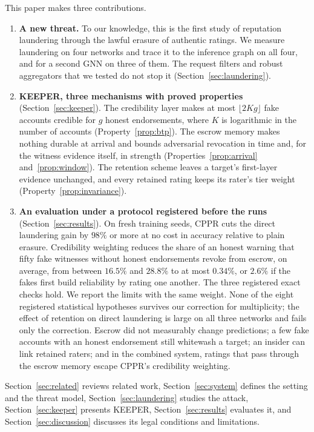 \documentclass[lettersize,journal]{IEEEtran}
\begin{document}
This paper makes three contributions.
\begin{enumerate}
  \item \textbf{A new threat.}
  To our knowledge, this is the first study of reputation laundering through the lawful erasure of authentic ratings.
  We measure laundering on four networks and trace it to the inference graph on all four, and for a second GNN on three of them. The request filters and robust aggregators that we tested do not stop it (Section~\ref{sec:laundering}).
  \item \textbf{KEEPER, three mechanisms with proved properties} (Section~\ref{sec:keeper}).
  The credibility layer makes at most $\lfloor 2Kg \rfloor$ fake accounts credible for $g$ honest endorsements, where $K$ is logarithmic in the number of accounts (Property~\ref{prop:btp}).
  The escrow memory makes nothing durable at arrival and bounds adversarial revocation in time and, for the witness evidence itself, in strength (Properties~\ref{prop:arrival} and~\ref{prop:window}).
  The retention scheme leaves a target's first-layer evidence unchanged, and every retained rating keeps its rater's tier weight (Property~\ref{prop:invariance}).
  \item \textbf{An evaluation under a protocol registered before the runs} (Section~\ref{sec:results}).
  On fresh training seeds, CPPR cuts the direct laundering gain by $98\%$ or more at no cost in accuracy relative to plain erasure.
  Credibility weighting reduces the share of an honest warning that fifty fake witnesses without honest endorsements revoke from escrow, on average, from between $16.5\%$ and $28.8\%$ to at most $0.34\%$, or $2.6\%$ if the fakes first build reliability by rating one another. The three registered exact checks hold.
  We report the limits with the same weight.
  None of the eight registered statistical hypotheses survives our correction for multiplicity; the effect of retention on direct laundering is large on all three networks and fails only the correction.
  Escrow did not measurably change predictions; a few fake accounts with an honest endorsement still whitewash a target; an insider can link retained raters; and in the combined system, ratings that pass through the escrow memory escape CPPR's credibility weighting.
\end{enumerate}
Section~\ref{sec:related} reviews related work, Section~\ref{sec:system} defines the setting and the threat model, Section~\ref{sec:laundering} studies the attack, Section~\ref{sec:keeper} presents KEEPER, Section~\ref{sec:results} evaluates it, and Section~\ref{sec:discussion} discusses its legal conditions and limitations.
\end{document}
